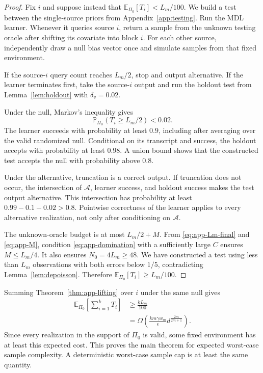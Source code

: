 \documentclass[twoside]{article}
\newcommand{\E}{\mathbb E}
\newcommand{\PP}{\mathbb P}
\newcommand{\1}{\mathbf 1}
\begin{document}
\begin{proof}
Fix $i$ and suppose instead that $\E_{\Pi_0}[T_i]<L_m/100$. We build a test
between the single-source priors from Appendix~\ref{app:testing}. Run the MDL
learner. Whenever it queries source $i$, return a sample from the unknown
testing oracle after shifting its covariate into block $i$. For each other
source, independently draw a null bias vector once and simulate samples from
that fixed environment.

If the source-$i$ query count reaches $L_m/2$, stop and output alternative. If
the learner terminates first, take the source-$i$ output and run the holdout
test from Lemma~\ref{lem:holdout} with $\delta_v=0.02$.

Under the null, Markov's inequality gives
\[
 \PP_{\Pi_0}(T_i\ge L_m/2)<0.02.
\]
The learner succeeds with probability at least $0.9$, including after
averaging over the valid randomized null. Conditional on its transcript and
success, the holdout accepts with probability at least $0.98$. A union bound
shows that the constructed test accepts the null with probability above
$0.8$.

Under the alternative, truncation is a correct output. If truncation does not
occur, the intersection of $\mathcal A$, learner success, and holdout success
makes the test output alternative. This intersection has probability at
least $0.99-0.1-0.02>0.8$. Pointwise correctness of the learner applies to
every alternative realization, not only after conditioning on $\mathcal A$.

The unknown-oracle budget is at most $L_m/2+M$. From
\eqref{eq:app-Lm-final} and \eqref{eq:app-M}, condition
\eqref{eq:app-domination} with a sufficiently large $C$ ensures
$M\le L_m/4$. It also ensures $N_0=4L_m\ge48$. We have constructed a test
using less than $L_m$ observations with both errors below $1/5$, contradicting
Lemma~\ref{lem:depoisson}. Therefore $\E_{\Pi_0}[T_i]\ge L_m/100$.
\end{proof}

Summing Theorem~\ref{thm:app-lifting} over $i$ under the same null gives
\begin{align*}
 \E_{\Pi_0}\left[\sum_{i=1}^kT_i\right]
 &\ge\frac{kL_m}{100}\\
 &=\Omega\!\left(
 \frac{k m\gamma w_m}{\epsilon}
 d^{\frac{2m}{2m+1}}
 \right).
\end{align*}
Since every realization in the support of $\Pi_0$ is valid, some fixed
environment has at least this expected cost. This proves the main theorem for
expected worst-case sample complexity. A deterministic worst-case sample cap
is at least the same quantity.
\end{document}
